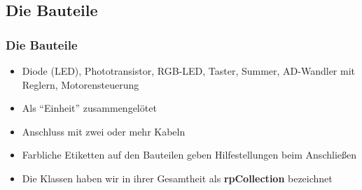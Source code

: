 \documentclass[usenames,dvipsnames]{beamer}
\begin{document}

\subsection{Die Bauteile}


\begin{frame}
\frametitle{Die Bauteile}
\begin{itemize}
\item Diode (LED), Phototransistor, RGB-LED, Taster, Summer, AD-Wandler mit Reglern, Motorensteuerung
\item Als \enquote{Einheit} zusammengelötet
\item Anschluss mit zwei oder mehr Kabeln
\item Farbliche Etiketten auf den Bauteilen geben Hilfestellungen beim Anschließen
\item Die Klassen haben wir in ihrer Gesamtheit als \textbf{rpCollection} bezeichnet
\end{itemize}
\end{frame}

\end{document}
